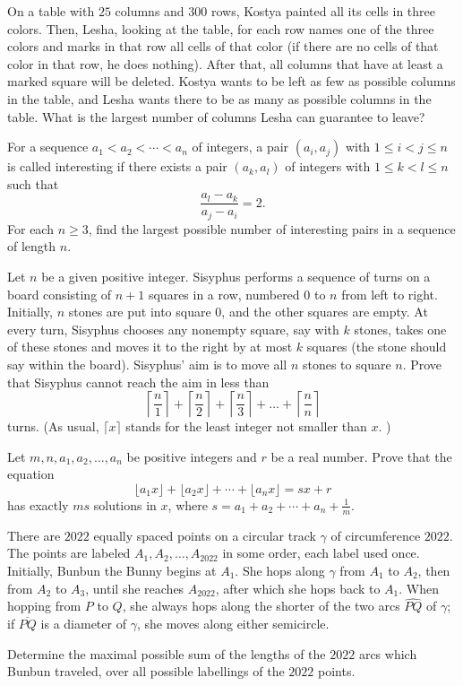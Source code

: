 \documentclass[11pt]{scrartcl}
\begin{document}
\begin{problem}[482459214391384]
	On a table with $25$ columns and $300$ rows, Kostya painted all its cells in three colors. Then, Lesha, looking at the table, for each row names one of the three colors and marks in that row all cells of that color (if there are no cells of that color in that row, he does nothing). After that, all columns that have at least a marked square will be deleted.
Kostya wants to be left as few as possible columns in the table, and Lesha wants there to be as many as possible columns in the table. What is the largest number of columns Lesha can guarantee to leave?
\end{problem}
\begin{problem}[1270053237908053448]
	For a sequence $a_1<a_2<\cdots<a_n$ of integers, a pair $(a_i,a_j)$ with $1\leq i<j\leq n$ is called interesting if there exists a pair $(a_k,a_l)$ of integers with $1\leq k<l\leq n$ such that$$\frac{a_l-a_k}{a_j-a_i}=2.$$For each $n\geq 3$, find the largest possible number of interesting pairs in a sequence of length $n$.
\end{problem}
\begin{problem}[8670333331361701457]
	Let $n$ be a given positive integer. Sisyphus performs a sequence of turns on a board consisting of $n + 1$ squares in a row, numbered $0$ to $n$ from left to right. Initially, $n$ stones are put into square $0$, and the other squares are empty. At every turn, Sisyphus chooses any nonempty square, say with $k$ stones, takes one of these stones and moves it to the right by at most $k$ squares (the stone should say within the board). Sisyphus' aim is to move all $n$ stones to square $n$.
Prove that Sisyphus cannot reach the aim in less than
\[ \left \lceil \frac{n}{1} \right \rceil + \left \lceil \frac{n}{2} \right \rceil + \left \lceil \frac{n}{3} \right \rceil + \dots + \left \lceil \frac{n}{n} \right \rceil \]turns. (As usual, $\lceil x \rceil$ stands for the least integer not smaller than $x$. )
\end{problem}
\begin{problem}[586194373652638]
Let $m,n,a_1,a_2,\dots,a_n$ be positive integers and $r$ be a real number. Prove that the equation
\[\lfloor a_1x\rfloor+\lfloor a_2x\rfloor+\cdots+\lfloor a_nx\rfloor=sx+r\]has exactly $ms$ solutions in $x$, where $s=a_1+a_2+\cdots+a_n+\frac1m$.
\end{problem}
\begin{problem}[2974998787723554962]
	There are $2022$ equally spaced points on a circular track $\gamma$ of circumference $2022$. The points are labeled $A_1, A_2, \ldots, A_{2022}$ in some order, each label used once. Initially, Bunbun the Bunny begins at $A_1$. She hops along $\gamma$ from $A_1$ to $A_2$, then from $A_2$ to $A_3$, until she reaches $A_{2022}$, after which she hops back to $A_1$. When hopping from $P$ to $Q$, she always hops along the shorter of the two arcs $\widehat{PQ}$ of $\gamma$; if $\overline{PQ}$ is a diameter of $\gamma$, she moves along either semicircle.

Determine the maximal possible sum of the lengths of the $2022$ arcs which Bunbun traveled, over all possible labellings of the $2022$ points.
\end{problem}
\end{document}
